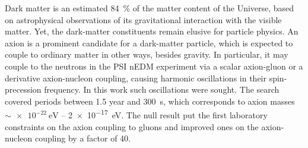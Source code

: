 Dark matter is an estimated \SI{84}{\percent} of the matter content of the Universe, based on astrophysical observations of its gravitational interaction with the visible matter.
Yet, the dark-matter constituents remain elusive for particle physics.
An axion is a prominent candidate for a dark-matter particle, which is expected to couple to ordinary matter in other ways, besides gravity.
In particular, it may couple to the neutrons in the PSI nEDM experiment via a scalar axion-gluon or a derivative axion-nucleon coupling, causing harmonic oscillations in their spin-precession frequency.
In this work such oscillations were sought.
The search covered periods between \num{1.5} year and \SI{300}{\second}, which corresponds to axion masses $\sim \SI{e-22}{\electronvolt}$ -- \SI{2e-17}{\electronvolt}.
The null result put the first laboratory constraints on the axion coupling to gluons and improved ones on the axion-nucleon coupling by a factor of 40.

\enlargethispage{2\baselineskip}

\endgroup			

\vfill
